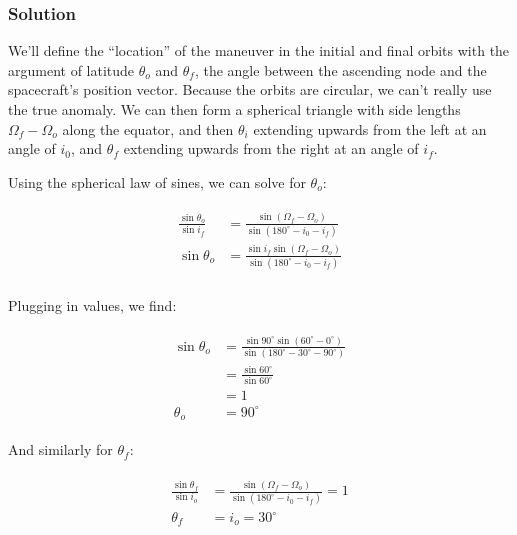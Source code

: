 \documentclass[
]{article}
\begin{document}
\subsubsection{Solution}\label{solution}

We'll define the ``location'' of the maneuver in the initial and final
orbits with the argument of latitude \(\theta_o\) and \(\theta_f\), the
angle between the ascending node and the spacecraft's position vector.
Because the orbits are circular, we can't really use the true anomaly.
We can then form a spherical triangle with side lengths
\(\Omega_f - \Omega_o\) along the equator, and then \(\theta_i\)
extending upwards from the left at an angle of \(i_0\), and \(\theta_f\)
extending upwards from the right at an angle of \(i_f\).

Using the spherical law of sines, we can solve for \(\theta_o\):

\[\begin{aligned}
\begin{aligned}
    \frac{\sin\theta_o}{\sin i_f} &= \frac{\sin(\Omega_f - \Omega_o)}{\sin\left(180^\circ-i_0-i_f\right)} \\
    \sin\theta_o &= \frac{\sin i_f \sin(\Omega_f - \Omega_o)}{\sin\left(180^\circ-i_0-i_f\right)} \\
\end{aligned}
\end{aligned}\]

Plugging in values, we find:

\[\begin{aligned}
\begin{aligned}
    \sin\theta_o &= \frac{\sin 90^\circ \sin(60^\circ - 0^\circ)}{\sin\left(180^\circ-30^\circ-90^\circ\right)} \\
    &= \frac{\sin 60^\circ}{\sin 60^\circ} \\
    &= 1 \\
    \theta_o &= 90^\circ
\end{aligned}
\end{aligned}\]

And similarly for \(\theta_f\):

\[\begin{aligned}
\begin{aligned}
    \frac{\sin\theta_f}{\sin i_o} &= \frac{\sin(\Omega_f - \Omega_o)}{\sin\left(180^\circ-i_0-i_f\right)} = 1 \\
    \theta_f &= i_o = 30^\circ
\end{aligned}
\end{aligned}\]
\end{document}
